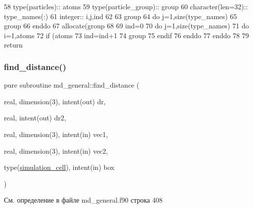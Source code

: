 \begin{DoxyCode}
58     \textcolor{keywordtype}{type}(particles)::   atoms
59     \textcolor{keywordtype}{type}(particle\_group)::  group
60     \textcolor{keywordtype}{character(len=32)}:: type\_names(:)
61     \textcolor{keywordtype}{integer}:: i,j,ind
62 
63     group%
64     \textcolor{keywordflow}{do} j=1,\textcolor{keyword}{size}(type\_names)
65         group%
66 \textcolor{keywordflow}{    enddo}
67     \textcolor{keyword}{allocate}(group%
68 
69     ind=0
70     \textcolor{keywordflow}{do} j=1,\textcolor{keyword}{size}(type\_names)
71         \textcolor{keywordflow}{do} i=1,atoms%
72             \textcolor{keywordflow}{if} (atoms%
73                 ind=ind+1
74                 group%
75 \textcolor{keywordflow}{            endif}
76 \textcolor{keywordflow}{        enddo}
77 \textcolor{keywordflow}{    enddo}
78 
79     \textcolor{keywordflow}{return}
\end{DoxyCode}
\mbox{\label{namespacemd__general_a33570f37733690b0634f039ad1bcf35e}} 
\subsubsection{\texorpdfstring{find\+\_\+distance()}{find\_distance()}}
{\footnotesize\ttfamily pure subroutine md\+\_\+general\+::find\+\_\+distance (\begin{DoxyParamCaption}\item[{real, dimension(3), intent(out)}]{dr,  }\item[{real, intent(out)}]{dr2,  }\item[{real, dimension(3), intent(in)}]{vec1,  }\item[{real, dimension(3), intent(in)}]{vec2,  }\item[{type(\mbox{\hyperlink{structmd__general_1_1simulation__cell}{simulation\+\_\+cell}}), intent(in)}]{box }\end{DoxyParamCaption})}



См. определение в файле md\+\_\+general.\+f90 строка 408


